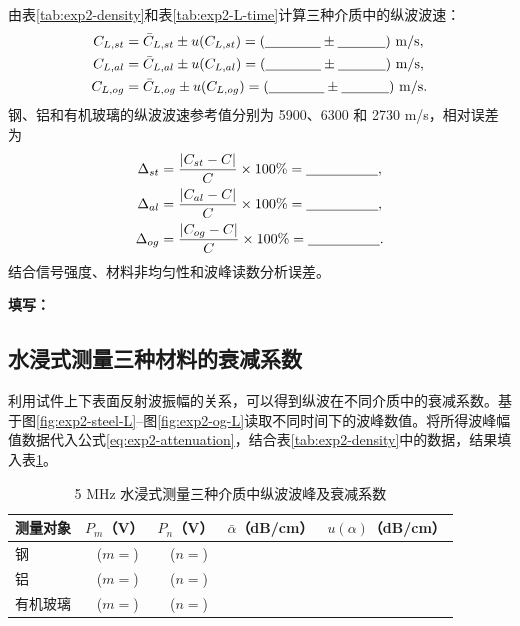 \documentclass[UTF8,a4paper,12pt]{ctexart}
\newcommand{\blank}[1][2.5cm]{\mbox{\underline{\hspace{#1}}}}
\newcommand{\answer}{\par\noindent\textbf{填写：}\blank[0.86\textwidth]\par}
\numberwithin{equation}{section}
\begin{document}
由表\ref{tab:exp2-density}和表\ref{tab:exp2-L-time}计算三种介质中的纵波波速：
\begin{subequations}
\begin{align}
  C_{L,st}&=\bar{C}_{L,st}\pm u(C_{L,st})=(\blank[1.4cm]\pm\blank[1.2cm])\ \mathrm{m/s},\\
  C_{L,al}&=\bar{C}_{L,al}\pm u(C_{L,al})=(\blank[1.4cm]\pm\blank[1.2cm])\ \mathrm{m/s},\\
  C_{L,og}&=\bar{C}_{L,og}\pm u(C_{L,og})=(\blank[1.4cm]\pm\blank[1.2cm])\ \mathrm{m/s}.
\end{align}
\end{subequations}
钢、铝和有机玻璃的纵波波速参考值分别为 5900、6300 和 2730 m/s，相对误差为
\begin{subequations}
\begin{align}
  \Delta_{st}&=\frac{|C_{st}-C|}{C}\times100\%=\blank[1.8cm],\\
  \Delta_{al}&=\frac{|C_{al}-C|}{C}\times100\%=\blank[1.8cm],\\
  \Delta_{og}&=\frac{|C_{og}-C|}{C}\times100\%=\blank[1.8cm].
\end{align}
\end{subequations}
结合信号强度、材料非均匀性和波峰读数分析误差。
\answer

\subsection{水浸式测量三种材料的衰减系数}
利用试件上下表面反射波振幅的关系，可以得到纵波在不同介质中的衰减系数。基于图\ref{fig:exp2-steel-L}--图\ref{fig:exp2-og-L}读取不同时间下的波峰数值。将所得波峰幅值数据代入公式\eqref{eq:exp2-attenuation}，结合表\ref{tab:exp2-density}中的数据，结果填入表\ref{tab:exp2-attenuation}。

\begin{table}[H]
\centering\small
\caption{5 MHz 水浸式测量三种介质中纵波波峰及衰减系数}
\label{tab:exp2-attenuation}
\begin{tabular}{lcccc}
\toprule
测量对象 & $P_m$（V） & $P_n$（V） & $\bar{\alpha}$（dB/cm） & $u(\alpha)$（dB/cm）\\
\midrule
钢 & \blank[1.3cm]\ ($m=$\blank[0.4cm]) & \blank[1.3cm]\ ($n=$\blank[0.4cm]) & \blank[1.3cm] & \blank[1.3cm]\\
铝 & \blank[1.3cm]\ ($m=$\blank[0.4cm]) & \blank[1.3cm]\ ($n=$\blank[0.4cm]) & \blank[1.3cm] & \blank[1.3cm]\\
有机玻璃 & \blank[1.3cm]\ ($m=$\blank[0.4cm]) & \blank[1.3cm]\ ($n=$\blank[0.4cm]) & \blank[1.3cm] & \blank[1.3cm]\\
\bottomrule
\end{tabular}
\end{table}
\end{document}
